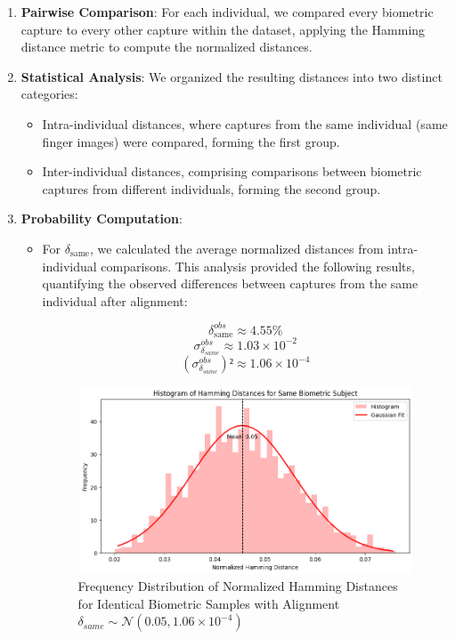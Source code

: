 \begin{enumerate}
    \item \textbf{Pairwise Comparison}: For each individual, we compared every biometric capture to every other capture within the dataset, applying the Hamming distance metric to compute the normalized distances.
    \item \textbf{Statistical Analysis}: We organized the resulting distances into two distinct categories:
    \begin{itemize}
        \item Intra-individual distances, where captures from the same individual (same finger images) were compared, forming the first group.
        \item Inter-individual distances, comprising comparisons between biometric captures from different individuals, forming the second group.
    \end{itemize}
    \item \textbf{Probability Computation}:
    \begin{itemize}
        \item For \( \delta_{\text{same}} \), we calculated the average normalized distances from intra-individual comparisons. This analysis provided the following results, quantifying the observed differences between captures from the same individual after alignment:

        \[ \delta_{\text{same}}^{obs} \approx 4.55\% \]
        \[ \sigma^{obs}_{\delta_{same}} \approx 1.03 \times 10^{-2} \]
        \[ (\sigma^{obs}_{\delta_{same}})² \approx 1.06 \times 10^{-4} \]

        \begin{figure}[H]
            \centering
            \includegraphics[width=0.7\linewidth]{latex-img/delta_same.png}
            \caption{Frequency Distribution of Normalized Hamming Distances for Identical Biometric Samples with Alignment \(\delta_{same} \sim \mathcal{N}(0.05, 1.06 \times 10^{-4})\)}
            \label{delta_same}
        \end{figure}
        

\end{itemize}
\end{enumerate}
